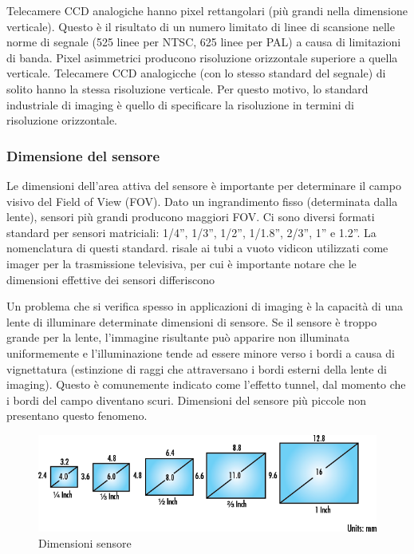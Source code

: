 Telecamere CCD analogiche hanno pixel rettangolari (più grandi nella dimensione verticale). Questo è il risultato di un numero limitato di linee di scansione nelle norme di segnale (525 linee per NTSC, 625 linee per PAL) a causa di limitazioni di banda. Pixel asimmetrici producono risoluzione orizzontale superiore a quella verticale. Telecamere CCD analogicche (con lo stesso standard del segnale) di solito hanno la stessa risoluzione verticale. Per questo motivo, lo standard industriale di imaging è quello di specificare la risoluzione in termini di risoluzione orizzontale.

\subsubsection{Dimensione del sensore}

Le dimensioni dell'area attiva del sensore  è importante per determinare il campo visivo del Field of View (FOV). 
Dato un ingrandimento fisso (determinata dalla lente), sensori più grandi producono maggiori FOV. Ci sono diversi formati standard per sensori matriciali: 1/4'', 1/3'', 1/2'', 1/1.8'', 2/3'', 1'' e 1.2''. La nomenclatura di questi standard. risale ai tubi a vuoto vidicon utilizzati come imager per la trasmissione televisiva, per cui è importante notare che le dimensioni effettive dei sensori differiscono 

Un problema che si verifica spesso in applicazioni di imaging è la capacità di una lente di illuminare determinate dimensioni di sensore. Se il sensore è troppo grande per la lente, l'immagine risultante può apparire non illuminata uniformemente e l'illuminazione tende ad essere minore verso i bordi a causa di vignettatura (estinzione di raggi che attraversano i bordi esterni della lente di imaging). Questo è comunemente indicato come l'effetto tunnel, dal momento che i bordi del campo diventano scuri. Dimensioni del sensore più piccole non presentano questo fenomeno.

\begin{figure}[!ht]
\centering
\includegraphics[width=.8\textwidth]{img/dimensione-sensore.png}
\caption{Dimensioni sensore}
\label{fig:dimensioni-sensore}
\end{figure}

